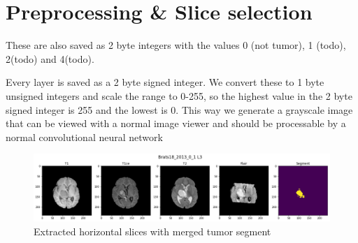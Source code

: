 \section{Preprocessing \& Slice selection}

These are also saved as 2 byte integers with the values 0 (not tumor), 1 (todo), 2(todo) and 4(todo).

Every layer is saved as a 2 byte signed integer. We convert these to 1 byte unsigned integers and scale the range to 0-255, so the highest value in the 2 byte signed integer is 255 and the lowest is 0.
This way we generate a grayscale image that can be viewed with a normal image viewer and should be processable by a normal convolutional neural network

\begin{figure}[H]
\centering
\caption{Extracted horizontal slices with merged tumor segment}
\includegraphics[width=15cm]{chapters/04_segmentation/images/preprocessing.png}
\end{figure}
